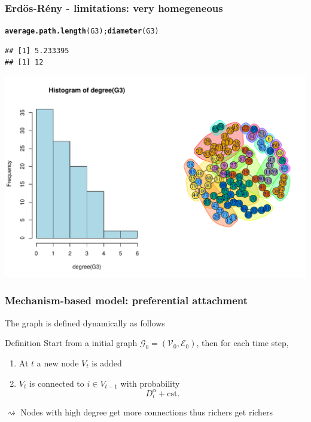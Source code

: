 \documentclass{beamer}\usepackage[]{graphicx}\usepackage[]{color}
\makeatletter
\newcommand{\hlstd}[1]{\textcolor[rgb]{0.345,0.345,0.345}{#1}}%
\newcommand{\hlkwd}[1]{\textcolor[rgb]{0.737,0.353,0.396}{\textbf{#1}}}%
\newenvironment{kframe}{%
 \def\at@end@of@kframe{}%
 \ifinner\ifhmode%
  \def\at@end@of@kframe{\end{minipage}}%
  \begin{minipage}{\columnwidth}%
 \fi\fi%
 \def\FrameCommand##1{\hskip\@totalleftmargin \hskip-\fboxsep
 \colorbox{shadecolor}{##1}\hskip-\fboxsep
     \hskip-\linewidth \hskip-\@totalleftmargin \hskip\columnwidth}%
 \MakeFramed {\advance\hsize-\width
   \@totalleftmargin\z@ \linewidth\hsize
   \@setminipage}}%
 {\par\unskip\endMakeFramed%
 \at@end@of@kframe}
\newenvironment{knitrout}{}{} %
\makeatother
\begin{document}
\begin{frame}[fragile]
  \frametitle{Erdös-Rény - limitations: very homegeneous}

\begin{knitrout}\scriptsize
{}\color{fgcolor}\begin{kframe}
\begin{alltt}
\hlkwd{average.path.length}\hlstd{(G3);} \hlkwd{diameter}\hlstd{(G3)}
\end{alltt}
\begin{verbatim}
## [1] 5.233395
## [1] 12
\end{verbatim}
\end{kframe}
\end{knitrout}

\begin{knitrout}\scriptsize
{}\color{fgcolor}
\includegraphics[width=.8\textwidth]{figures/ER_limitation2-1} 
\end{knitrout}
\end{frame}

\begin{frame}
  \frametitle{Mechanism-based model: preferential attachment}

  The graph is defined dynamically as follows
  \begin{block}{Definition}
    Start from a initial graph $\mathcal{G}_0 = (\mathcal{V}_0,\mathcal{E}_0)$, then for each time step,
    \begin{enumerate}
      \item At $t$ a new node $V_t$ is added
      \item $V_t$ is connected to $i \in V_{t-1}$ with probability
      \begin{equation*}
        D_i^\alpha + \mathrm{cst.}
      \end{equation*}
    \end{enumerate}
  \end{block}
  $\rightsquigarrow$ Nodes with high degree get more connections thus \alert{richers get richers}
\end{frame}
\end{document}
